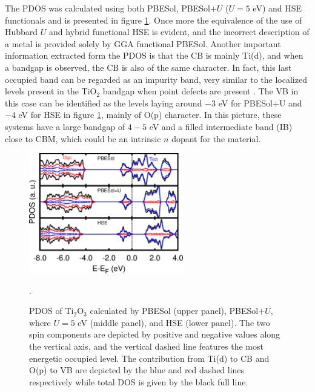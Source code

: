  The PDOS was calculated using both PBESol, PBESol+$U$ ($U = 5$ eV) and HSE functionals and is presented in figure \ref{fig:dos-ti2o3-prb}. Once more the equivalence of the use of Hubbard $U$ and hybrid functional HSE is evident, and the incorrect description of a metal is provided solely by GGA functional PBESol. Another important information extracted form the PDOS is that the CB is mainly Ti(d), and when a bandgap is observed, the CB is also of the same character. In fact, this last occupied band can be regarded as an impurity band, very similar to the localized levels present in the TiO$_2$ bandgap when point defects are present \cite{Lee2012,Janotti2010}. The VB in this case can be identified as the levels laying around $-3$ eV for PBESol+U and $-4$ eV for HSE in figure \ref{fig:dos-ti2o3-prb}, mainly of O(p) character. In this picture, these systems have a large bandgap of $4-5$ eV and a filled intermediate band (IB) close to CBM, which could be an intrinsic $n$ dopant for the material.  
 
 \begin{center}
  \begin{figure}[ht!]
      \begin{center}
        \includegraphics[width=0.6\textwidth]{img/dos-ti2o3-prb.jpg}
      \end{center}
      \caption{PDOS of Ti$_2$O$_3$ calculated by PBESol (upper panel), PBESol$+U$, where $U = 5$ eV (middle panel), and HSE (lower panel). The two spin components are depicted by positive and negative values along the vertical axis, and the vertical dashed line features the most energetic occupied level. The contribution from Ti(d) to CB and O(p) to VB are depicted by the blue and red dashed lines respectively while total DOS is given by the black full line.}.
      \label{fig:dos-ti2o3-prb} 
  \end{figure}
 \end{center}

